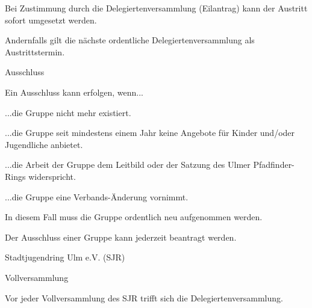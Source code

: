 \begin{legal}
\begin{legal}
\begin{legal}
                    \item Bei Zustimmung durch die Delegiertenversammlung (Eilantrag) kann der 
                          Austritt sofort umgesetzt werden.
                    \item Andernfalls gilt die nächste ordentliche Delegiertenversammlung als 
                          Austrittstermin.
                \end{legal}
            \item Ausschluss
                \begin{legal}
                    \item Ein Ausschluss kann erfolgen, wenn...
                        \begin{legal}
                            \item ...die Gruppe nicht mehr existiert.
                            \item ...die Gruppe seit mindestens einem Jahr keine Angebote für Kinder 
                                  und/oder Jugendliche anbietet.
                            \item ...die Arbeit der Gruppe dem Leitbild oder der Satzung des Ulmer 
                                  Pfadfinder-Rings widerspricht.
                            \item ...die Gruppe eine Verbands-Änderung vornimmt.
                                \begin{legal}
                                    \item In diesem Fall muss die Gruppe ordentlich neu aufgenommen 
                                          werden.
                                \end{legal}
                        \end{legal}
                    \item Der Ausschluss einer Gruppe kann jederzeit beantragt werden.
                \end{legal}
        \end{legal}
    \item Stadtjugendring Ulm e.V. (SJR)
        \begin{legal}
            \item Vollversammlung
                \begin{legal}
                    \item Vor jeder Vollversammlung des SJR trifft sich die Delegiertenversammlung.

\end{legal}
\end{legal}
\end{legal}
